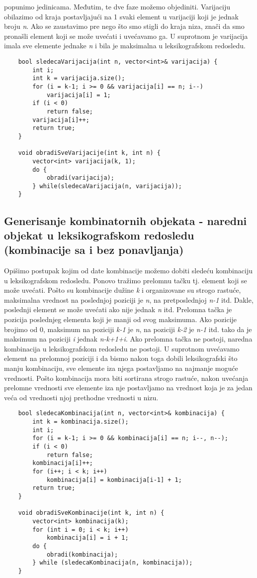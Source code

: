 \documentclass{article}
\begin{document}
popunimo jedinicama. Međutim, te dve faze možemo objediniti. Varijaciju
obilazimo od kraja postavljajući na 1 svaki element u varijaciji koji je jednak
broju \textit{n}. Ako se zaustavimo pre nego što smo stigli do kraja niza, znači da smo
pronašli element koji se može uvećati i uvećavamo ga. U suprotnom je varijacija
imala sve elemente jednake \textit{n} i bila je maksimalna u leksikografskom redosledu.
\begin{lstlisting}
    bool sledecaVarijacija(int n, vector<int>& varijacija) {
        int i;
        int k = varijacija.size();
        for (i = k-1; i >= 0 && varijacija[i] == n; i--)
            varijacija[i] = 1;
        if (i < 0) 
            return false;
        varijacija[i]++;
        return true;
    }
    
    void obradiSveVarijacije(int k, int n) {
        vector<int> varijacija(k, 1);
        do {
            obradi(varijacija);
        } while(sledecaVarijacija(n, varijacija));
    }
\end{lstlisting}

\subsection{Generisanje kombinatornih objekata - naredni objekat u leksikografskom redosledu (kombinacije sa i bez ponavljanja)}
Opišimo postupak kojim od date kombinacije možemo dobiti sledeću kombinaciju
u leksikografskom redosledu. Ponovo tražimo prelomnu tačku tj. element koji se
može uvećati. Pošto su kombinacije dužine \textit{k} i organizovane su strogo rastuće,
maksimalna vrednost na poslednjoj poziciji je \textit{n}, na pretposlednjoj \textit{n-1} itd.
Dakle, poslednji element se može uvećati ako nije jednak \textit{n} itd. Prelomna tačka je pozicija poslednjeg elementa koji je
manji od svog maksimuma. Ako pozicije brojimo od 0, maksimum na poziciji
\textit{k-1} je \textit{n}, na poziciji \textit{k-2} je \textit{n-1} itd. tako da je maksimum na poziciji \textit{i} jednak
\textit{n-k+1+i}. Ako prelomna tačka ne postoji, naredna kombinacija u leksikografskom redosledu ne postoji.
U suprotnom uvećavamo element na prelomnoj poziciji i da bismo nakon toga
dobili leksikografski što manju kombinaciju, sve elemente iza njega postavljamo
na najmanje moguće vrednosti. Pošto kombinacija mora biti sortirana strogo
rastuće, nakon uvećanja prelomne vrednosti sve elemente iza nje postavljamo na
vrednost koja je za jedan veća od vrednosti njoj prethodne vrednosti u nizu. \begin{lstlisting}
    bool sledecaKombinacija(int n, vector<int>& kombinacija) {
        int k = kombinacija.size();
        int i;
        for (i = k-1; i >= 0 && kombinacija[i] == n; i--, n--);
        if (i < 0)
            return false;
        kombinacija[i]++;
        for (i++; i < k; i++)
            kombinacija[i] = kombinacija[i-1] + 1;
        return true;
    }

    void obradiSveKombinacije(int k, int n) {
        vector<int> kombinacija(k);
        for (int i = 0; i < k; i++)
            kombinacija[i] = i + 1;
        do {
            obradi(kombinacija);
        } while (sledecaKombinacija(n, kombinacija));
    }
\end{lstlisting}
\end{document}
